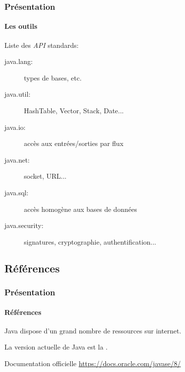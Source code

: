 		\begin{frame}
			\frametitle{Présentation}
			\framesubtitle{Les outils}
			Liste des \emph{API} standards:
			\begin{description}
				\item[java.lang:] types de bases, etc.
				\item[java.util:] HashTable, Vector, Stack, Date...
				\item[java.io:] accès aux entrées/sorties par flux
				\item[java.net:] socket, URL...
				\item[java.sql:] accès homogène aux bases de données
				\item[java.security:] signatures, cryptographie, authentification...
			\end{description}
		\end{frame}	
	
	
	\subsection{Références}
	
		\begin{frame}
			\frametitle{Présentation}
			\framesubtitle{Références}
			Java dispose d'un grand nombre de ressources sur internet.
			
			La version actuelle de Java est la .
			
			\begin{block}{Documentation officielle}
				\url{https://docs.oracle.com/javase/8/}
			\end{block}
		\end{frame}	